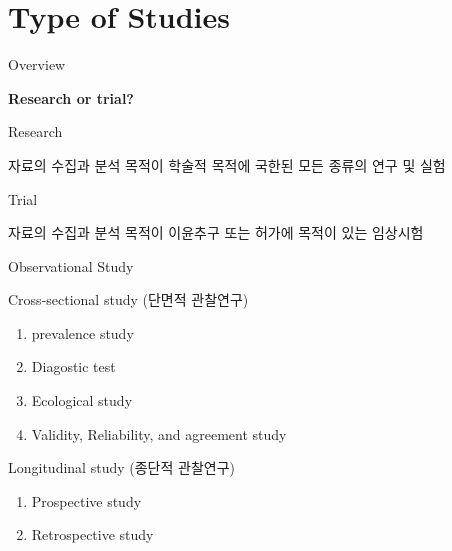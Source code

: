 \documentclass[9pt,ignorenonframetext,xcolor=dvipsnames]{beamer}
\providecommand{\tightlist}{%
  \setlength{\itemsep}{0pt}\setlength{\parskip}{0pt}}
\newlength{\wideitemsep}
\let\olditem\item
\renewcommand{\item}{\setlength{\itemsep}{\wideitemsep}\olditem}
\begin{document}
\section{Type of Studies}\label{type-of-studies}

\begin{frame}{Overview}

\LARGE{\textbf{Research or trial?}}

\begin{block}{Research}

\normalsize{자료의 수집과 분석 목적이 학술적 목적에 국한된 모든 종류의 연구 및 실험}

\end{block}

\begin{block}{Trial}

\normalsize{자료의 수집과 분석 목적이 이윤추구 또는 허가에 목적이 있는 임상시험}

\end{block}

\end{frame}

\begin{frame}{Observational Study}

\begin{block}{Cross-sectional study (단면적 관찰연구)}

\begin{enumerate}
\def\labelenumi{\arabic{enumi}.}
\tightlist
\item
  prevalence study
\item
  Diagostic test
\item
  Ecological study
\item
  Validity, Reliability, and agreement study
\end{enumerate}

\end{block}

\begin{block}{Longitudinal study (종단적 관찰연구)}

\begin{enumerate}
\def\labelenumi{\arabic{enumi}.}
\tightlist
\item
  Prospective study
\item
  Retrospective study
\end{enumerate}

\end{block}

\end{frame}
\end{document}

